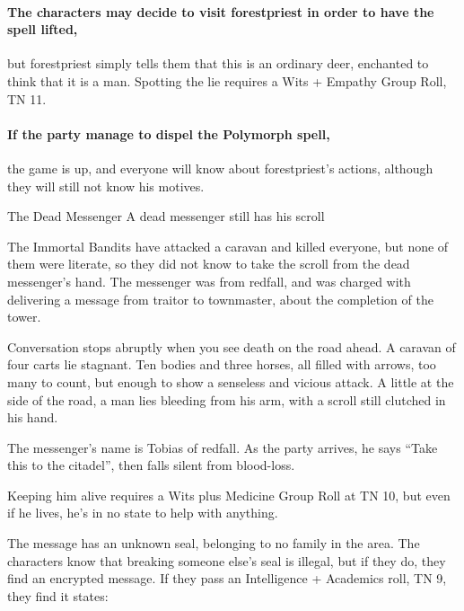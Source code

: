 \begin{multicols}{2}
\paragraph{The characters may decide to visit \gls{forestpriest} in order to have the spell lifted,}
but \gls{forestpriest} simply tells them that this is an ordinary deer, enchanted to think that it is a man.
Spotting the lie requires a Wits + Empathy Group Roll, TN 11.

\paragraph{If the party manage to dispel the Polymorph spell,}
the game is up, and everyone will know about \gls{forestpriest}'s actions, although they will still not know his motives.

{The Dead Messenger}%
{A dead messenger still has his scroll}%

The Immortal Bandits have attacked a caravan and killed everyone, but none of them were literate, so they did not know to take the scroll from the dead messenger's hand.
The messenger was from \gls{redfall}, and was charged with delivering a message from \gls{traitor} to \gls{townmaster}, about the completion of the tower.

\begin{boxtext}

  Conversation stops abruptly when you see death on the road ahead.
  A caravan of four carts lie stagnant.
  Ten bodies and three horses, all filled with arrows, too many to count, but enough to show a senseless and vicious attack.
  A little at the side of the road, a man lies bleeding from his arm, with a scroll still clutched in his hand.

\end{boxtext}

The messenger's name is Tobias of \gls{redfall}.
As the party arrives, he says ``Take this to the citadel'', then falls silent from blood-loss.

Keeping him alive requires a Wits plus Medicine Group Roll at TN 10, but even if he lives, he's in no state to help with anything.

The message has an unknown seal, belonging to no family in the area.
The characters know that breaking someone else's seal is illegal, but if they do, they find an encrypted message.
If they pass an Intelligence + Academics roll, TN 9, they find it states:

\begin{speechtext}


\end{speechtext}
\end{multicols}
